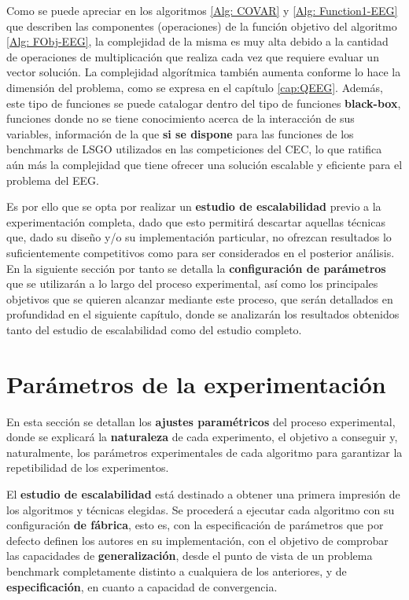 Como se puede apreciar en los algoritmos \ref{Alg: COVAR} y \ref{Alg: Function1-EEG} que describen las componentes (operaciones) de la función objetivo del algoritmo \ref{Alg: FObj-EEG}, la complejidad de la misma es muy alta debido a la cantidad de operaciones de multiplicación que realiza cada vez que requiere evaluar un vector solución. La complejidad algorítmica también aumenta conforme lo hace la dimensión del problema, como se expresa en el capítulo \ref{cap:QEEG}. Además, este tipo de funciones se puede catalogar dentro del tipo de funciones \textbf{black-box}, funciones donde no se tiene conocimiento acerca de la interacción de sus variables, información de la que \textbf{si se dispone} para las funciones de los benchmarks de LSGO utilizados en las competiciones del CEC, lo que ratifica aún más la complejidad que tiene ofrecer una solución escalable y eficiente para el problema del EEG. 

Es por ello que se opta por realizar un \textbf{estudio de escalabilidad} previo a la experimentación completa, dado que esto permitirá descartar aquellas técnicas que, dado su diseño y/o su implementación particular, no ofrezcan resultados lo suficientemente competitivos como para ser considerados en el posterior análisis. En la siguiente sección por tanto se detalla la \textbf{configuración de parámetros} que se utilizarán a lo largo del proceso experimental, así como los principales objetivos que se quieren alcanzar mediante este proceso, que serán detallados en profundidad en el siguiente capítulo, donde se analizarán los resultados obtenidos tanto del estudio de escalabilidad como del estudio completo.



\section{Parámetros de la experimentación}

 En esta sección se detallan los \textbf{ajustes paramétricos} del proceso experimental, donde se explicará la \textbf{naturaleza} de cada experimento, el objetivo a conseguir y, naturalmente, los parámetros experimentales de cada algoritmo para garantizar la repetibilidad de los experimentos.

El \textbf{estudio de escalabilidad}  está destinado a obtener una primera impresión de los algoritmos y técnicas elegidas. Se procederá a ejecutar cada algoritmo con su configuración \textbf{de fábrica}, esto es, con la especificación de parámetros que por defecto definen los autores en su implementación, con el objetivo de comprobar las capacidades de \textbf{generalización}, desde el punto de vista de un problema benchmark completamente distinto a cualquiera de los anteriores, y de \textbf{especificación}, en cuanto a capacidad de convergencia.


